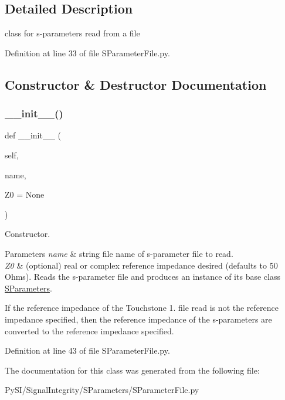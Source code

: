 \subsection{Detailed Description}
class for s-\/parameters read from a file 

Definition at line 33 of file S\+Parameter\+File.\+py.



\subsection{Constructor \& Destructor Documentation}
\mbox{\label{classSignalIntegrity_1_1SParameters_1_1SParameterFile_1_1SParameterFile_ac64ec849ddf7924828e6292d81a6c5d0}} 
\subsubsection{\texorpdfstring{\+\_\+\+\_\+init\+\_\+\+\_\+()}{\_\_init\_\_()}}
{\footnotesize\ttfamily def \+\_\+\+\_\+init\+\_\+\+\_\+ (\begin{DoxyParamCaption}\item[{}]{self,  }\item[{}]{name,  }\item[{}]{Z0 = {\ttfamily None} }\end{DoxyParamCaption})}



Constructor. 


\begin{DoxyParams}{Parameters}
{\em name} & string file name of s-\/parameter file to read. \\
\hline
{\em Z0} & (optional) real or complex reference impedance desired (defaults to 50 Ohms). Reads the s-\/parameter file and produces an instance of its base class \hyperlink{namespaceSignalIntegrity_1_1SParameters_1_1SParameters}{S\+Parameters}.\\
\hline
\end{DoxyParams}
If the reference impedance of the Touchstone 1. file read is not the reference impedance specified, then the reference impedance of the s-\/parameters are converted to the reference impedance specified. 

Definition at line 43 of file S\+Parameter\+File.\+py.



The documentation for this class was generated from the following file\+:\begin{DoxyCompactItemize}
\item 
Py\+S\+I/\+Signal\+Integrity/\+S\+Parameters/S\+Parameter\+File.\+py\end{DoxyCompactItemize}
